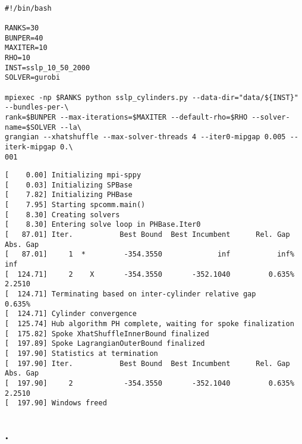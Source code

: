 \documentclass{article}
\begin{document}
\begin{verbatim}

#!/bin/bash

RANKS=30
BUNPER=40
MAXITER=10
RHO=10
INST=sslp_10_50_2000
SOLVER=gurobi

mpiexec -np $RANKS python sslp_cylinders.py --data-dir="data/${INST}" --bundles-per-\
rank=$BUNPER --max-iterations=$MAXITER --default-rho=$RHO --solver-name=$SOLVER --la\
grangian --xhatshuffle --max-solver-threads 4 --iter0-mipgap 0.005 --iterk-mipgap 0.\
001

\end{verbatim}

\begin{verbatim}
[    0.00] Initializing mpi-sppy
[    0.03] Initializing SPBase
[    7.82] Initializing PHBase
[    7.95] Starting spcomm.main()
[    8.30] Creating solvers
[    8.30] Entering solve loop in PHBase.Iter0
[   87.01] Iter.           Best Bound  Best Incumbent      Rel. Gap        Abs. Gap
[   87.01]     1  *         -354.3550             inf           inf%             inf
[  124.71]     2    X       -354.3550       -352.1040         0.635%          2.2510
[  124.71] Terminating based on inter-cylinder relative gap        0.635%
[  124.71] Cylinder convergence
[  125.74] Hub algorithm PH complete, waiting for spoke finalization
[  175.82] Spoke XhatShuffleInnerBound finalized
[  197.89] Spoke LagrangianOuterBound finalized
[  197.90] Statistics at termination
[  197.90] Iter.           Best Bound  Best Incumbent      Rel. Gap        Abs. Gap
[  197.90]     2            -354.3550       -352.1040         0.635%          2.2510
[  197.90] Windows freed
\end{verbatim}

\subsection{.}
\end{document}
